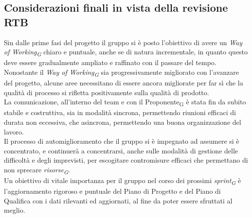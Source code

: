 \subsection{Considerazioni finali in vista della revisione RTB}
Sin dalle prime fasi del progetto il gruppo si è posto l'obiettivo di avere un \textit{Way of Working\textsubscript{G}} chiaro e puntuale, anche se di natura incrementale, in quanto questo deve essere gradualmente ampliato e raffinato con il passare del tempo. Nonostante il \textit{Way of Working\textsubscript{G}} sia progressivamente migliorato con l’avanzare del progetto, alcune aree necessitano di essere ancora migliorate per far sì che la qualità di processo si rifletta positivamente sulla qualità di prodotto. \\
La comunicazione, all'interno del team e con il Proponente\textsubscript{G} è stata fin da subito stabile e costruttiva, sia in modalità sincrona, permettendo riunioni efficaci di durata non eccessiva, che asincrona, permettendo una buona organizzazione del lavoro. \\
Il processo di automiglioramento che il gruppo si è impegnato ad assumere si è concentrato, e continuerà a concentrarsi, anche sulle modalità di gestione delle difficoltà e degli imprevisti, per escogitare contromisure efficaci che permettano di non sprecare \textit{risorse\textsubscript{G}}. \\
Un obiettivo di vitale importanza per il gruppo nel corso dei prossimi \textit{sprint\textsubscript{G}} è l'aggiornamento rigoroso e puntuale del Piano di Progetto e del Piano di Qualifica con i dati rilevanti ed aggiornati, al fine da poter essere sfruttati al meglio. \\
